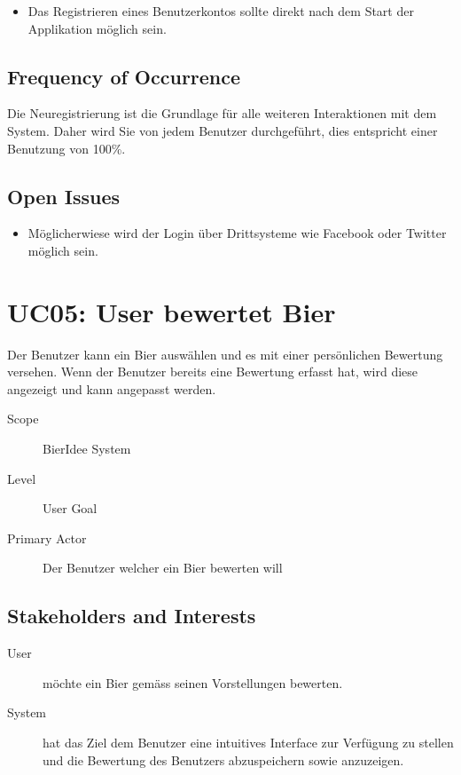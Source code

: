 \documentclass[10pt,a4paper]{scrartcl}
\begin{document}
\begin{itemize}
\item Das Registrieren eines Benutzerkontos sollte direkt nach dem Start der Applikation möglich sein. 
\end{itemize}



\subsection*{Frequency of Occurrence}

Die Neuregistrierung ist die Grundlage für alle weiteren Interaktionen mit dem System. Daher wird Sie von jedem Benutzer durchgeführt, dies entspricht einer Benutzung von 100\%.


\subsection*{Open Issues}

\begin{itemize}
\item Möglicherwiese wird der Login über Drittsysteme wie Facebook oder Twitter möglich sein.
\end{itemize}


\section*{UC05: User bewertet Bier}
Der Benutzer kann ein Bier auswählen und es mit einer persönlichen Bewertung versehen. Wenn der Benutzer bereits eine Bewertung erfasst hat, wird diese angezeigt und kann angepasst werden.

\begin{description}
\item[Scope] BierIdee System
\item[Level] User Goal
\item[Primary Actor] Der Benutzer welcher ein Bier bewerten will
\end{description}


\subsection*{Stakeholders and Interests}

\begin{description}
\item[User] möchte ein Bier gemäss seinen Vorstellungen bewerten.
\item[System] hat das Ziel dem Benutzer eine intuitives Interface zur Verfügung zu stellen und die Bewertung des Benutzers abzuspeichern sowie anzuzeigen.
\end{description}
\end{document}
